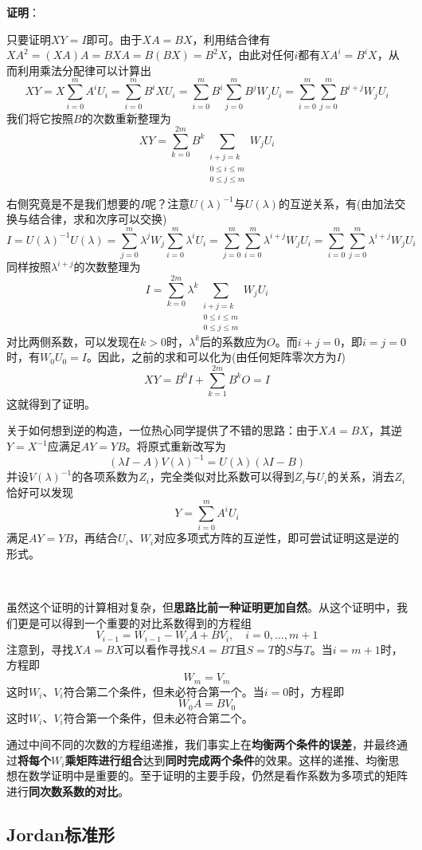 \documentclass[a4paper,UTF8,fontset=windows,AutoFakeBold]{ctexart}
\newcommand*{\note}{\noindent *}
\newcommand{\proo}[1]{{\vspace{5pt}\kaishu\noindent\textbf{证明}：\vspace{-3pt}
\begin{compactitem}
    \item[] #1
\end{compactitem}
}}
\begin{document}
\proo{
    只要证明$XY=I$即可。由于$XA=BX$，利用结合律有$XA^2=(XA)A=BXA=B(BX)=B^2X$，由此对任何$i$都有$XA^i=B^iX$，从而利用乘法分配律可以计算出
    $$XY=X\sum_{i=0}^mA^iU_i=\sum_{i=0}^mB^iXU_i=\sum_{i=0}^mB^i\sum_{j=0}^mB^jW_jU_i=\sum_{i=0}^m\sum_{j=0}^mB^{i+j}W_jU_i$$
    我们将它按照$B$的次数重新整理为
    $$XY=\sum_{k=0}^{2m}B^k\sum_{\substack{i+j=k\\0\le i\le m\\0\le j\le m}}W_jU_i$$

    右侧究竟是不是我们想要的$I$呢？注意$U(\lambda)^{-1}$与$U(\lambda)$的互逆关系，有(由加法交换与结合律，求和次序可以交换)
    $$I=U(\lambda)^{-1}U(\lambda)=\sum_{j=0}^m\lambda^jW_j\sum_{i=0}^m\lambda^iU_i=\sum_{j=0}^m\sum_{i=0}^m\lambda^{i+j}W_jU_i=\sum_{i=0}^m\sum_{j=0}^m\lambda^{i+j}W_jU_i$$
    同样按照$\lambda^{i+j}$的次数整理为
    $$I=\sum_{k=0}^{2m}\lambda^k\sum_{\substack{i+j=k\\0\le i\le m\\0\le j\le m}}W_jU_i$$
    对比两侧系数，可以发现在$k>0$时，$\lambda^k$后的系数应为$O$。而$i+j=0$，即$i=j=0$时，有$W_0U_0=I$。因此，之前的求和可以化为(由任何矩阵零次方为$I$)
    $$XY=B^0I+\sum_{k=1}^{2m}B^kO=I$$
    这就得到了证明。
}

\note 关于如何想到逆的构造，一位热心同学提供了不错的思路：由于$XA=BX$，其逆$Y=X^{-1}$应满足$AY=YB$。将原式重新改写为
$$(\lambda I-A)V(\lambda)^{-1}=U(\lambda)(\lambda I-B)$$
并设$V(\lambda)^{-1}$的各项系数为$Z_i$，完全类似对比系数可以得到$Z_i$与$U_i$的关系，消去$Z_i$恰好可以发现
$$Y=\sum_{i=0}^mA^iU_i$$
满足$AY=YB$，再结合$U_i$、$W_i$对应多项式方阵的互逆性，即可尝试证明这是逆的形式。

\

虽然这个证明的计算相对复杂，但\textbf{思路比前一种证明更加自然}。从这个证明中，我们更是可以得到一个重要的对比系数得到的方程组
$$V_{i-1}=W_{i-1}-W_iA+BV_i,\quad i=0,\dots,m+1$$
注意到，寻找$XA=BX$可以看作寻找$SA=BT$且$S=T$的$S$与$T$。当$i=m+1$时，方程即
$$W_m=V_m$$
这时$W_i$、$V_i$符合第二个条件，但未必符合第一个。当$i=0$时，方程即
$$W_0A=BV_0$$
这时$W_i$、$V_i$符合第一个条件，但未必符合第二个。

通过中间不同的次数的方程组递推，我们事实上在\textbf{均衡两个条件的误差}，并最终通过\textbf{将每个$W_i$乘矩阵进行组合}达到\textbf{同时完成两个条件}的效果。这样的递推、均衡思想在数学证明中是重要的。至于证明的主要手段，仍然是看作系数为多项式的矩阵进行\textbf{同次数系数的对比}。

\subsection{Jordan标准形}
\end{document}
